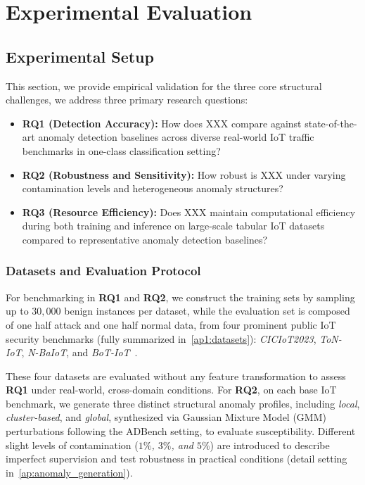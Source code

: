 \documentclass[final,twocolumn,10pt]{elsarticle}
\begin{document}
\section{Experimental Evaluation}
\subsection{Experimental Setup}
\label{sec:exp_su}

This section, we provide empirical validation for the three core structural challenges, we address three primary research questions:
\begin{itemize}
    \item \textbf{RQ1 (Detection Accuracy):} How does XXX compare against state-of-the-art anomaly detection baselines across diverse real-world IoT traffic benchmarks in one-class classification setting?
    \item \textbf{RQ2 (Robustness and Sensitivity):}  How robust is XXX under varying contamination levels and heterogeneous anomaly structures?
    \item \textbf{RQ3 (Resource Efficiency):} Does XXX maintain computational efficiency during both training and inference on large-scale tabular IoT datasets compared to representative anomaly detection baselines?
\end{itemize}

\subsubsection{Datasets and Evaluation Protocol}


For benchmarking in \textbf{RQ1} and \textbf{RQ2}, we construct the training sets by sampling up to $30{,}000$ benign instances per dataset, while the evaluation set is composed of one half attack and one half normal data, from four prominent public IoT security benchmarks (fully summarized in~\ref{ap1:datasets}): \textit{CICIoT2023}, \textit{ToN-IoT}, \textit{N-BaIoT}, and \textit{BoT-IoT}~\cite{neto2023ciciot2023,8490192,koroniotis2019towards,fesz-dm97-19}.

These four datasets are evaluated without any feature transformation to assess \textbf{RQ1} under real-world, cross-domain conditions. For \textbf{RQ2}, on each base IoT benchmark, we generate three distinct structural anomaly profiles, including \textit{local}, \textit{cluster-based}, and \textit{global}, synthesized via Gaussian Mixture Model (GMM) perturbations following the ADBench setting, to evaluate susceptibility. Different slight levels of contamination (\emph{$1\%$, $3\%$, and $5\%$}) are introduced to describe imperfect supervision and test robustness in practical conditions (detail setting in~\ref{ap:anomaly_generation}).
                
\end{document}
